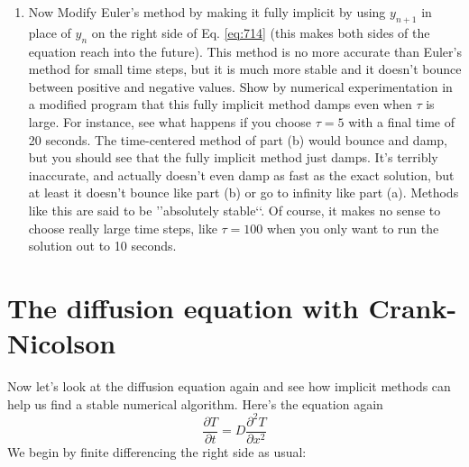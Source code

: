 \begin{enumerate}[label=(\alph*)]
\item  Now Modify Euler\rq s method by making it fully implicit by using $y_{n+1}$
in place of $y_n$ on the right side of Eq. \eqref{eq:714} (this makes both sides of
the equation reach into the future). This method is no more accurate
than Euler\rq s method for small time steps, but it is much more stable
and it doesn\rq t bounce between positive and negative values.
Show by numerical experimentation in a modified program that this
fully implicit method damps even when $ \tau $ is large. For instance, see
what happens if you choose $ \tau = 5$ with a final time of 20 seconds. The
time-centered method of part (b) would bounce and damp, but you
should see that the fully implicit method just damps. It\rq s terribly inaccurate, and actually doesn\rq t even damp as fast as the exact solution,
but at least it doesn\rq t bounce like part (b) or go to infinity like part (a).
Methods like this are said to be \rq\rq absolutely stable\lq\lq. Of course, it makes
no sense to choose really large time steps, like $ \tau = 100$ when you only
want to run the solution out to 10 seconds.

\end{enumerate}

\section*{The diffusion equation with Crank-Nicolson}

Now let\rq s look at the diffusion equation again and see how implicit methods can
help us find a stable numerical algorithm. Here\rq s the equation again
\begin{equation}\label{eq:715}
\frac{\partial T}{\partial t}=D \frac{\partial^{2} T}{\partial x^{2}}
\end{equation}
We begin by finite differencing the right side as usual:

